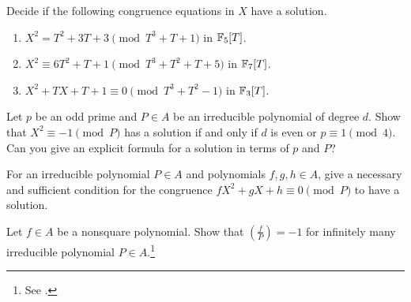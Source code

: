 \begin{exercise}
    Decide if the following congruence equations in $X$ have a solution.
    \begin{enumerate}
        \item $X^2 = T^2 + 3T + 3 \pmod{T^3 + T + 1}$ in $\mathbb{F}_5[T]$.
        \item $X^2 \equiv 6T^2 + T + 1 \pmod{T^3 + T^2 + T + 5}$ in $\mathbb{F}_7[T]$.
        \item $X^2 + TX + T + 1 \equiv 0 \pmod{T^3 + T^2 - 1}$ in $\mathbb{F}_3[T]$.
    \end{enumerate}
\end{exercise}

\begin{exercise}
    Let $p$ be an odd prime and $P \in A$ be an irreducible polynomial of degree $d$.
    Show that $X^2 \equiv -1 \pmod{P}$ has a solution if and only if $d$ is even or $p \equiv 1 \pmod{4}$.
    Can you give an explicit formula for a solution in terms of $p$ and $P$?
\end{exercise}

\begin{exercise}
    For an irreducible polynomial $P \in A$ and polynomials $f, g, h \in A$, give a necessary and sufficient condition for the congruence $f X^2 + g X + h \equiv 0 \pmod{P}$ to have a solution.
\end{exercise}

\begin{exercise}
    Let $f \in A$ be a nonsquare polynomial. Show that $\left(\frac{f}{P}\right) = -1$ for infinitely many irreducible polynomial $P \in A$.\footnote{See \cite[Theorem 4.5]{conrad_rec_odd}.}
\end{exercise}


\newpage
